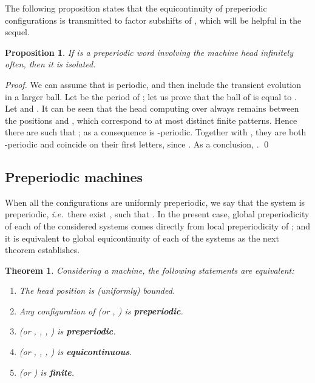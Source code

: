\documentclass{llncs}
\newtheorem{teo}{Theorem}
\newtheorem{prop}{Proposition}
\newcommand{\ie}{\textit{i.e.}\ }
\begin{document}
The following proposition states that the equicontinuity of preperiodic configurations is transmitted to factor subshifts of , which will be helpful in the sequel.
\begin{prop}\label{p:shper}
 If  is a preperiodic word involving the machine head infinitely often, then it is isolated.
\end{prop}
\begin{proof}
 We can assume that  is periodic, and then include the transient evolution in a larger ball.
 Let  be the period of ; let us prove that the ball  of  is equal to .
 Let  and . It can be seen that the head computing over  always remains between the positions  and , which correspond to at most  distinct finite patterns. Hence there are  such that ; as a consequence  is -periodic. Together with , they are both -periodic and coincide on their first  letters, since . As a conclusion, .
\qed\end{proof} \subsection{Preperiodic machines}
When all the configurations are uniformly preperiodic, we say that the system is preperiodic, \ie there exist ,  such that .
In the present case, global preperiodicity of each of the considered systems comes directly from local preperiodicity of ; and it is equivalent to global equicontinuity of each of the systems as the next theorem establishes.
\begin{teo}
Considering a machine, the following statements are equivalent:
\begin{enumerate}
 \item\label{bounded} The head position is (uniformly) bounded.
\item Any configuration of  (or , ) is {\bf preperiodic}.
 \item\label{prep} (or , , , ) is {\bf preperiodic}.
 \item\label{equi} (or , , , ) is {\bf equicontinuous}.
 \item\label{finite}  (or ) is {\bf finite}.
\end{enumerate}
\end{teo}
\end{document}
